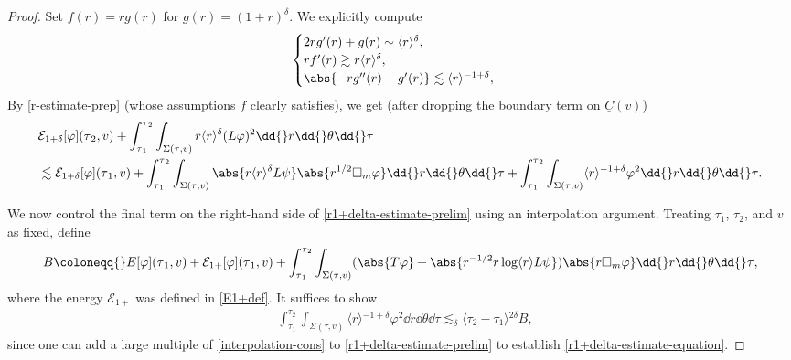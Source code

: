 \documentclass[10pt, reqno]{amsart}
\begin{document}
\begin{proof}
 Set \(f(r) = rg(r)\) for \(g(r) = (1 + r)^\delta{}\).
We explicitly compute
\begin{equation}
\begin{cases}
2rg'(r) + g(r)\sim \langle{}r\rangle{}^\delta{},\\
rf'(r)\gtrsim r\langle{}r\rangle{}^{\delta{}}, \\
\abs{-rg''(r) - g'(r)}\lesssim \langle{}r\rangle{}^{-1+\delta{}}, \\
\end{cases}
\end{equation}
By \cref{r-estimate-prep} (whose assumptions \(f\) clearly satisfies), we get
(after dropping the boundary term on \(\underline{C}(v)\))
\begin{equation}\label{r1+delta-estimate-prelim}
\begin{split}
&\mathcal{E}_{1+\delta}[\varphi{}](\tau{}_2,v) + \int_{\tau{}_1}^{\tau{}_2} \int _{\Sigma{}{(\tau{},v)}}r\langle{}r\rangle{}^\delta{}(L\varphi{})^2 \dd{}r\dd{}\theta{}\dd{}\tau{}  \\
&\lesssim \mathcal{E}_{1+\delta}[\varphi{}](\tau{}_1,v) + \int_{\tau{}_1}^{\tau{}_2} \int _{\Sigma{}(\tau{},v)}\abs{r\langle{}r\rangle{}^\delta{}L\psi{}}\abs{r^{1/2}\Box{}_m\varphi{}}\dd{}r\dd{}\theta{}\dd{}\tau{} + \int_{\tau{}_1}^{\tau{}_2} \int _{\Sigma{}(\tau{},v)}\langle{}r\rangle{}^{-1+\delta{}}\varphi^2 \dd{}r\dd{}\theta{}\dd{}\tau{}.
\end{split}
\end{equation}

 We now control the
final term on the right-hand side of \cref{r1+delta-estimate-prelim} using
an interpolation argument. Treating \(\tau{}_1\), \(\tau_2\), and \(v\) as fixed, define
\begin{equation}
B\coloneqq{}E[\varphi{}](\tau{}_1,v) + \mathcal{E}_{1+}[\varphi{}](\tau{}_1,v) + \int_{\tau{}_1}^{\tau{}_2} \int _{\Sigma{}(\tau{},v)} (\abs{T\varphi{}} +  \abs{r^{-1/2}r\log \langle{}r\rangle{}L\psi{}})\abs{r\Box{}_m\varphi{}} \dd{}r\dd{}\theta{}\dd{}\tau{},
\end{equation}
where the energy \(\mathcal{E}_{1 + }\) was defined in \cref{E1+def}. It suffices to
show
\begin{equation}\label{interpolation-cons}
\begin{split}
&\int_{\tau{}_1}^{\tau{}_2} \int _{\Sigma{}(\tau{},v)}\langle{}r\rangle{}^{-1+\delta{}}\varphi^2\dd{}r\dd{}\theta{}\dd{}\tau{} \lesssim_\delta{} \langle{}\tau{}_2-\tau{}_1\rangle{}^{2\delta{}}B,
\end{split}
\end{equation}
since one can add a large multiple of \cref{interpolation-cons} to \cref{r1+delta-estimate-prelim}
to establish \cref{r1+delta-estimate-equation}.


\end{proof}
\end{document}
